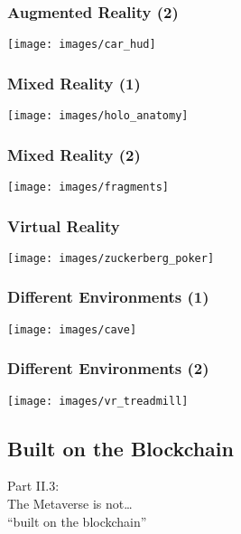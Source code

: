 \documentclass[aspectratio=169,x11names]{beamer}
\begin{document}
\begin{frame}
\frametitle{Augmented Reality (2)}
\begin{center}
\texttt{[image: images/car\_hud]} 
\end{center}
\end{frame}

\begin{frame}
\frametitle{Mixed Reality (1)}
\begin{center}
\texttt{[image: images/holo\_anatomy]} 
\end{center}
\end{frame}

\begin{frame}
\frametitle{Mixed Reality (2)}
\begin{center}
\texttt{[image: images/fragments]} 
\end{center}
\end{frame}

\begin{frame}
\frametitle{Virtual Reality}
\begin{center}
\texttt{[image: images/zuckerberg\_poker]} 
\end{center}
\end{frame}

\begin{frame}
\frametitle{Different Environments (1)}
\begin{center}
\texttt{[image: images/cave]} 
\end{center}
\end{frame}

\begin{frame}
\frametitle{Different Environments (2)}
\begin{center}
\texttt{[image: images/vr\_treadmill]} 
\end{center}
\end{frame}


\subsection{Built on the Blockchain}

\begin{frame}
\begin{center}
\Large
Part II.3:\bigskip\\
\huge
The Metaverse is not\dots\\ ``built on the blockchain''
\end{center}
\end{frame}
\end{document}
